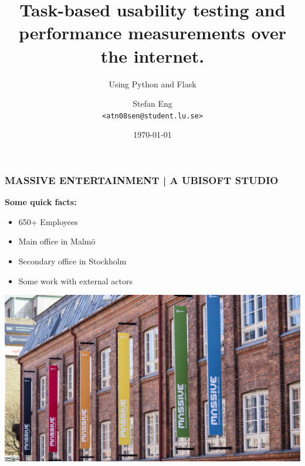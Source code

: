 \documentclass[xcolor=svgnames,10pt,aspectratio=1610]{beamer}
\begin{document}
\title[Usability testing over the internet] %
{Task-based usability testing and \\ performance measurements over the internet.}

\subtitle{Using Python and Flask}

\author[Stefan Eng] %
{Stefan Eng \\\texttt{<atn08sen@student.lu.se>}}




\newcommand\BackImage[2][scale=1]{%
\BgThispage
\backgroundsetup{
  contents={\texttt{[image: \#2]}}
  }
}

\date[]{\today}


\frame{\titlepage}

\begin{frame}
  \frametitle{MASSIVE ENTERTAINMENT | A UBISOFT STUDIO}
  \begin{minipage}{.49\textwidth}
    \textbf{Some quick facts:}
    \begin{itemize}
      \item{650+ Employees}
      \item{Main office in Malmö}
      \item{Secondary office in Stockholm}
      \item{Some work with external actors}
    \end{itemize}
  \end{minipage}
  \begin{minipage}{.49\textwidth}
    \includegraphics{img/massive_outside.jpg}
  \end{minipage}
\end{frame}
\end{document}
